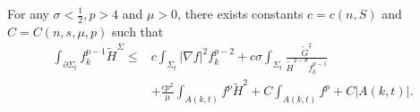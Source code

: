 \begin{lemma} \label{BoundaryFH}
    For any $\sigma <\frac{1}{2}, p>4$ and $\mu >0$, there exists constants $c=c(n,S)$ and $C=C(n,s,\mu ,p)$ such that
    \begin{equation}
    \begin{split}
        \int_{\partial \Sigma_t} f_{k}^{p-1}\tilde{H}^{\Sigma } 
    \leq & c \int_{\Sigma_t} \left| \nabla f \right| ^2 f_{k}^{p-2} +c \sigma \int_{\Sigma_t} \frac{\tilde{G}^{2} }{\tilde{H}^{2-\sigma } f_{k}^{p-1} } \\
    &+ \frac{cp^2}{\mu }\int_{A(k,t)}^{}f^p \tilde{H}^{2} + C \int_{A(k,t)}^{}f^p + C \left| A(k,t) \right| .
    \end{split}
    \end{equation} 
\end{lemma}

